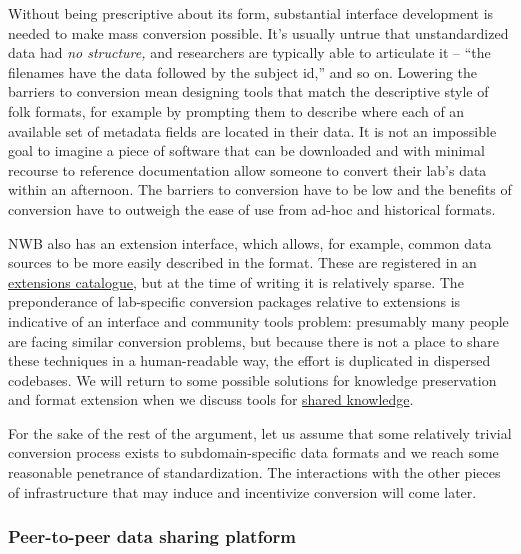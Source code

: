 \documentclass[11pt]{article}
\begin{document}
\begin{multicols}{2}
Without being prescriptive about its form, substantial interface
development is needed to make mass conversion possible. It's usually
untrue that unstandardized data had \emph{no structure,} and researchers
are typically able to articulate it -- ``the filenames have the data
followed by the subject id,'' and so on. Lowering the barriers to
conversion mean designing tools that match the descriptive style of folk
formats, for example by prompting them to describe where each of an
available set of metadata fields are located in their data. It is not an
impossible goal to imagine a piece of software that can be downloaded
and with minimal recourse to reference documentation allow someone to
convert their lab's data within an afternoon. The barriers to conversion
have to be low and the benefits of conversion have to outweigh the ease
of use from ad-hoc and historical formats.

NWB also has an extension interface, which allows, for example, common
data sources to be more easily described in the format. These are
registered in an \href{https://nwb-extensions.github.io/}{extensions
catalogue}, but at the time of writing it is relatively sparse. The
preponderance of lab-specific conversion packages relative to extensions
is indicative of an interface and community tools problem: presumably
many people are facing similar conversion problems, but because there is
not a place to share these techniques in a human-readable way, the
effort is duplicated in dispersed codebases. We will return to some
possible solutions for knowledge preservation and format extension when
we discuss tools for \protect\hyperlink{shared-knowledge}{shared
knowledge}.

For the sake of the rest of the argument, let us assume that some
relatively trivial conversion process exists to subdomain-specific data
formats and we reach some reasonable penetrance of standardization. The
interactions with the other pieces of infrastructure that may induce and
incentivize conversion will come later.

\hypertarget{peer-to-peer-data-sharing-platform}{%
\subsubsection{Peer-to-peer data sharing
platform}\label{peer-to-peer-data-sharing-platform}}


\end{multicols}
\end{document}

